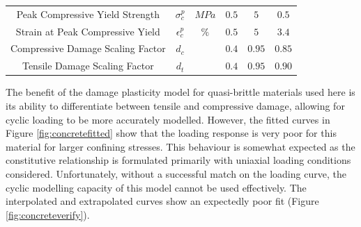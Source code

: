\begin{table}[!htb]
\begin{tabulary}{\textwidth}{@{}cCcCCC@{}}
Peak Compressive Yield Strength    & $\sigma_c^{p}$                   & $MPa$          & $0.5$                                                           & $5$                                                             & $0.5$                                                             \\
Strain at Peak Compressive Yield   & $\epsilon_c^{p}$                 & $\%$           & $0.5$                                                           & $5$                                                             & $3.4$                                                             \\
Compressive Damage Scaling Factor   & $d_c$ &            & $0.4$                                                          & $0.95$                                                           & $0.85$                                                          \\
Tensile Damage Scaling Factor   & $d_t$ &            & $0.4$                                                           & $0.95$                                                            & $0.90$                                                            \\ \bottomrule
\end{tabulary}
\end{table}

The benefit of the damage plasticity model for quasi-brittle materials used here is its ability to differentiate between tensile and compressive damage, allowing for cyclic loading to be more accurately modelled. However, the fitted curves in Figure \ref{fig:concretefitted} show that the loading response is very poor for this material for larger confining stresses. This behaviour is somewhat expected as the constitutive relationship is formulated primarily with uniaxial loading conditions considered. Unfortunately, without a successful match on the loading curve, the cyclic modelling capacity of this model cannot be used effectively. The interpolated and extrapolated curves show an expectedly poor fit (Figure \ref{fig:concreteverify}).

